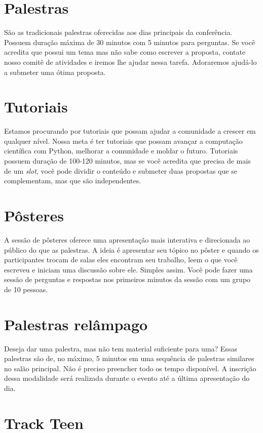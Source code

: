 \documentclass[a4paper,twocolumn,openright,article,12pt]{memoir}
\begin{document}
\section*{Palestras}

São as tradicionais palestras oferecidas aos dias principais da conferência. Possuem duração máxima de 30 minutos com 5 minutos para perguntas. Se você acredita
que possui um tema mas não sabe como escrever a proposta, contate nosso comitê
de atividades e iremos lhe ajudar nessa tarefa. Adoraremos ajudá-lo a submeter
uma ótima proposta.

\section*{Tutoriais}

Estamos procurando por tutoriais que possam ajudar a comunidade a crescer em qualquer nível. Nossa meta é ter tutoriais que possam avançar a computação científica com Python, melhorar a comunidade e moldar o futuro. Tutoriais possuem duração de 100-120 minutos, mas se você acredita que precisa de mais de um \emph{slot}, você pode dividir o conteúdo e submeter duas propostas que se complementam, mas que são independentes.

\section*{Pôsteres}

A sessão de pôsteres oferece uma apresentação mais interativa e direcionada ao público do que as palestras. A ideia é apresentar seu tópico no pôster e quando os participantes trocam de salas eles encontram seu trabalho, leem o que você escreveu e iniciam uma discussão sobre ele. Simples assim. Você pode fazer uma sessão de perguntas e respostas nos primeiros minutos da sessão com um grupo de 10 pessoas.

\section*{Palestras relâmpago}

Deseja dar uma palestra, mas não tem material suficiente para uma? Essas palestras são de, no máximo, 5 minutos em uma sequência de palestras similares no salão principal. Não é preciso preencher todo os tempo disponível. A inscrição dessa modalidade será realizada durante o evento até a última apresentação do dia.

\section*{Track Teen}
\end{document}
